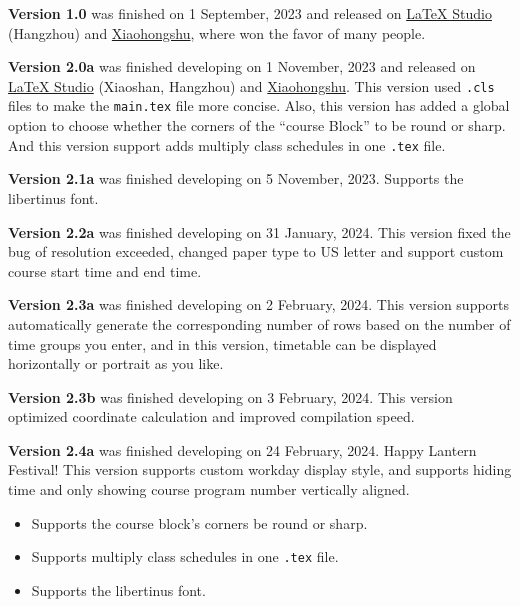 \documentclass[11pt]{article}
\def\datechange#1#2{%
  \noindent{\makebox[\textwidth][r]{\color{H7}\rule{1.15\textwidth}{.4pt}}}
  \noindent\makebox[0pt][r]{\makebox[-3em][r]{\small\textbf{\textcolor{H7}{#1}}}\;\;}{\sffamily Update: \ignorespaces#2}}
\begin{document}
\textsf{\bfseries Version 1.0} was finished on 1 September, 2023 and released on \href{https://www.latexstudio.net/index/details/index/mid/3625.html}{\LaTeX{} Studio} (Hangzhou) and \href{http://xhslink.com/od7Ycw}{Xiaohongshu}, where won the favor of many people.

\textsf{\bfseries Version 2.0a} was finished developing on 1 November, 2023 and released on \href{https://www.latexstudio.net/index/details/index/mid/3636.html}{\LaTeX{} Studio} (Xiaoshan, Hangzhou) and \href{http://xhslink.com/od7Ycw}{Xiaohongshu}. This version used \verb|.cls| files to make the \verb|main.tex| file more concise. Also, this version has added a global option to choose whether the corners of the ``course Block'' to be round or sharp. And this version support adds multiply class schedules in one \verb|.tex| file.

\textsf{\bfseries Version 2.1a} was finished developing on 5 November, 2023. Supports the libertinus font.

\textsf{\bfseries Version 2.2a} was finished developing on 31 January, 2024. This version fixed the bug of resolution exceeded, changed paper type to US letter and support custom course start time and end time.

\textsf{\bfseries Version 2.3a} was finished developing on 2 February, 2024. This version supports automatically generate the corresponding number of rows based on the number of time groups you enter, and in this version, timetable can be displayed horizontally or portrait as you like.

\textsf{\bfseries Version 2.3b} was finished developing on 3 February, 2024. This version optimized coordinate calculation and improved compilation speed.

\textsf{\bfseries Version 2.4a} was finished developing on 24 February, 2024. Happy Lantern Festival! This version supports custom workday display style, and supports hiding time and only showing course program number vertically aligned.

\clearpage

\datechange{2023/09/01}{Version 2.0a}
\begin{itemize}
    \item Supports the course block's corners be round or sharp.
    \item Supports multiply class schedules in one \verb|.tex| file.
\end{itemize}

\datechange{2023/11/05}{Version 2.1a}
\begin{itemize}
    \item Supports the libertinus font.
\end{itemize}
\end{document}
